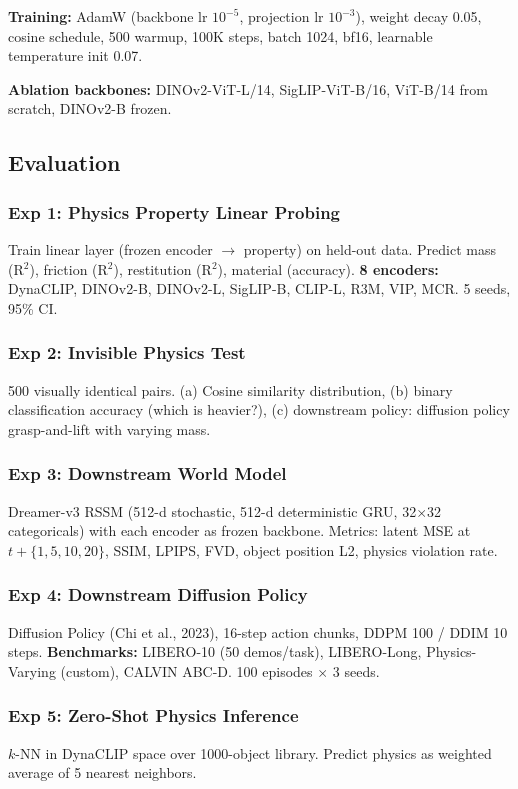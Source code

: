 \documentclass[11pt,a4paper]{article}
\begin{document}
\textbf{Training:} AdamW (backbone lr $10^{-5}$, projection lr $10^{-3}$), weight decay 0.05, cosine schedule, 500 warmup, 100K steps, batch 1024, bf16, learnable temperature init 0.07.

\textbf{Ablation backbones:} DINOv2-ViT-L/14, SigLIP-ViT-B/16, ViT-B/14 from scratch, DINOv2-B frozen.

\subsection{Evaluation}

\subsubsection{Exp 1: Physics Property Linear Probing}
Train linear layer (frozen encoder $\to$ property) on held-out data. Predict mass (R$^2$), friction (R$^2$), restitution (R$^2$), material (accuracy). \textbf{8 encoders:} DynaCLIP, DINOv2-B, DINOv2-L, SigLIP-B, CLIP-L, R3M, VIP, MCR. 5 seeds, 95\% CI.

\subsubsection{Exp 2: Invisible Physics Test}
500 visually identical pairs. (a) Cosine similarity distribution, (b) binary classification accuracy (which is heavier?), (c) downstream policy: diffusion policy grasp-and-lift with varying mass.

\subsubsection{Exp 3: Downstream World Model}
Dreamer-v3 RSSM (512-d stochastic, 512-d deterministic GRU, 32$\times$32 categoricals) with each encoder as frozen backbone. Metrics: latent MSE at $t{+}\{1,5,10,20\}$, SSIM, LPIPS, FVD, object position L2, physics violation rate.

\subsubsection{Exp 4: Downstream Diffusion Policy}
Diffusion Policy (Chi et al., 2023), 16-step action chunks, DDPM 100 / DDIM 10 steps. \textbf{Benchmarks:} LIBERO-10 (50 demos/task), LIBERO-Long, Physics-Varying (custom), CALVIN ABC-D. 100 episodes $\times$ 3 seeds.

\subsubsection{Exp 5: Zero-Shot Physics Inference}
$k$-NN in DynaCLIP space over 1000-object library. Predict physics as weighted average of 5 nearest neighbors.
\end{document}

